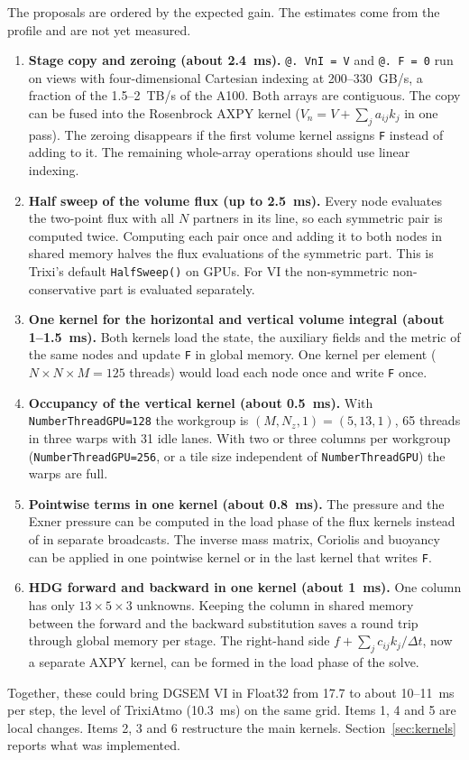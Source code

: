 \documentclass[11pt,a4paper]{article}
\newcommand{\code}[1]{\texttt{#1}}
\begin{document}
The proposals are ordered by the expected gain. The estimates come from the
profile and are not yet measured.

\begin{enumerate}
\item \textbf{Stage copy and zeroing (about 2.4~ms).} \code{@. VnI = V}
  and \code{@. F = 0} run on views with four-dimensional Cartesian indexing
  at 200--330~GB/s, a fraction of the 1.5--2~TB/s of the A100. Both arrays
  are contiguous. The copy can be fused into the Rosenbrock AXPY kernel
  ($V_n = V + \sum_j a_{ij} k_j$ in one pass). The zeroing disappears if
  the first volume kernel assigns \code{F} instead of adding to it. The
  remaining whole-array operations should use linear indexing.
\item \textbf{Half sweep of the volume flux (up to 2.5~ms).} Every node
  evaluates the two-point flux with all $N$ partners in its line, so each
  symmetric pair is computed twice. Computing each pair once and adding it
  to both nodes in shared memory halves the flux evaluations of the symmetric
  part. This is Trixi's default \code{HalfSweep()} on GPUs. For VI the
  non-symmetric non-conservative part is evaluated separately.
\item \textbf{One kernel for the horizontal and vertical volume integral
  (about 1--1.5~ms).} Both kernels load the state, the auxiliary fields and
  the metric of the same nodes and update \code{F} in global memory. One
  kernel per element ($N\times N\times M=125$ threads) would load each node
  once and write \code{F} once.
\item \textbf{Occupancy of the vertical kernel (about 0.5~ms).} With
  \code{NumberThreadGPU=128} the workgroup is $(M,N_z,1)=(5,13,1)$, 65
  threads in three warps with 31 idle lanes. With two or three columns per
  workgroup (\code{NumberThreadGPU=256}, or a tile size independent of
  \code{NumberThreadGPU}) the warps are full.
\item \textbf{Pointwise terms in one kernel (about 0.8~ms).} The
  pressure and the Exner pressure can be computed in the load phase of the
  flux kernels instead of in separate broadcasts. The inverse mass matrix,
  Coriolis and buoyancy can be applied in one pointwise kernel or in the
  last kernel that writes \code{F}.
\item \textbf{HDG forward and backward in one kernel (about 1~ms).} One
  column has only $13\times5\times3$ unknowns. Keeping the column in shared
  memory between the forward and the backward substitution saves a
  round trip through global memory per stage. The right-hand side
  $f + \sum_j c_{ij}k_j/\Delta t$, now a separate AXPY kernel, can be formed
  in the load phase of the solve.
\end{enumerate}
Together, these could bring DGSEM VI in Float32 from 17.7 to about
10--11~ms per step, the level of TrixiAtmo (10.3~ms) on the same grid.
Items 1, 4 and 5 are local changes. Items 2, 3 and 6 restructure the main
kernels. Section~\ref{sec:kernels} reports what was implemented.
\end{document}
